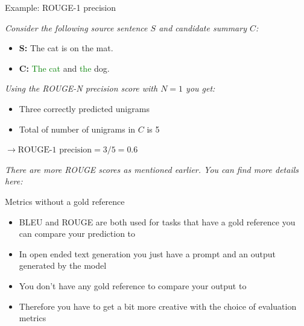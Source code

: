 \begin{vbframe}{Example: ROUGE-1 precision}

\vfill
\textit{Consider the following source sentence $S$ and candidate summary $C$:}

\begin{itemize}
    \item \textbf{S:} The cat is on the mat.
    \item \textbf{C:} \textcolor{green}{The cat} and \textcolor{green}{the} dog.
\end{itemize}

\textit{Using the ROUGE-N precision score with $N = 1$ you get:}

\begin{itemize}
    \item Three correctly predicted unigrams
    \item Total of number of unigrams in $C$ is 5
\end{itemize}

$\rightarrow \text{ROUGE-1 precision}=3/5 = 0.6$

\textit{There are more ROUGE scores as mentioned earlier. You can find more details here:} 
\vfill
    
\end{vbframe}

\begin{vbframe}{Metrics without a gold reference}

\vfill

\begin{itemize}
    \item BLEU and ROUGE are both used for tasks that have a gold reference you can compare your prediction to
    \item In open ended text generation you just have a prompt and an output generated by the model
    \item You don't have any gold reference to compare your output to
    \item Therefore you have to get a bit more creative with the choice of evaluation metrics
\end{itemize}

\vfill
    
\end{vbframe}


